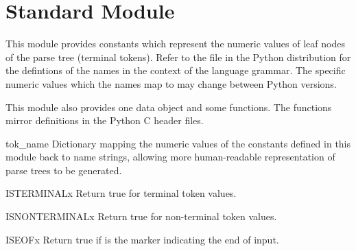 \section{Standard Module }
\label{module-token}

This module provides constants which represent the numeric values of
leaf nodes of the parse tree (terminal tokens).  Refer to the file
 in the Python distribution for the defintions
of the names in the context of the language grammar.  The specific
numeric values which the names map to may change between Python
versions.

This module also provides one data object and some functions.  The
functions mirror definitions in the Python C header files.



\begin{datadesc}{tok_name}
Dictionary mapping the numeric values of the constants defined in this
module back to name strings, allowing more human-readable
representation of parse trees to be generated.
\end{datadesc}

\begin{funcdesc}{ISTERMINAL}{x}
Return true for terminal token values.
\end{funcdesc}

\begin{funcdesc}{ISNONTERMINAL}{x}
Return true for non-terminal token values.
\end{funcdesc}

\begin{funcdesc}{ISEOF}{x}
Return true if  is the marker indicating the end of input.
\end{funcdesc}

\begin{seealso}
\end{seealso}
